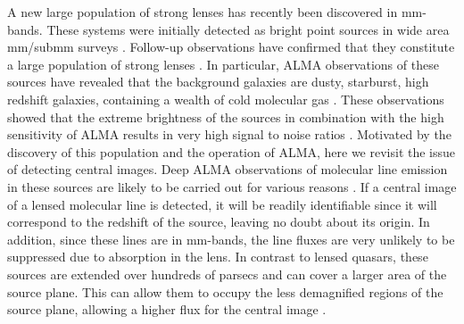 \documentclass[chicago]{emulateapj}
\begin{document}


A new large population of strong lenses has recently been discovered in mm-bands. These systems were initially detected as bright point sources in wide area mm/submm surveys \citep{vieira:10,negrello:10}. Follow-up observations have confirmed that they constitute a large population of strong lenses \citep{vieira:13, hezaveh:13b, bussmann:13}.
In particular, ALMA observations of these sources have revealed that the background galaxies are dusty, starburst, high redshift galaxies, containing a wealth of cold molecular gas \citep{Weiss:13}.  These observations showed that the extreme brightness of the sources in combination with the high sensitivity of ALMA results in very high signal to noise ratios \citep[e.g. the lens models in][were based on just $\sim50$ second long observations]{hezaveh:13b}.
Motivated by the discovery of this population and the operation of ALMA, here we revisit the issue of detecting central images.
Deep ALMA observations of molecular line emission in these sources are likely to be carried out for various reasons \citep[e.g.,][]{hezaveh:14a,hezaveh:14b}. If a central image of a lensed molecular line is detected, it will be readily identifiable since it will correspond to the redshift of the source, leaving no doubt about its origin. In addition, since these lines are in mm-bands, the line fluxes are very unlikely to be suppressed due to absorption in the lens. 
In contrast to lensed quasars, these sources are extended over hundreds of parsecs and can cover a larger area of the source plane. This can allow them to occupy the less demagnified regions of the source plane, allowing a higher flux for the central image \citep[the opposite effect of magnification damping due to extended sources, see e.g.,][]{hezaveh:11}.
\end{document}
